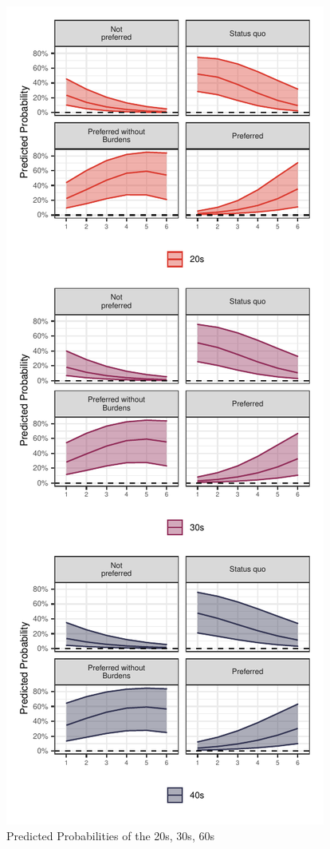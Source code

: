 \documentclass[letterpaper,9pt,twocolumn,twoside,]{pinp}
\begin{document}
\begin{figure}[htbp]

{\centering \includegraphics{manuscript_files/figure-latex/fig11-1} 

}

\caption{\label{fig11} Predicted Probabilities of the 20s, 30s, 60s}\label{fig:fig11}
\end{figure}
\end{document}
